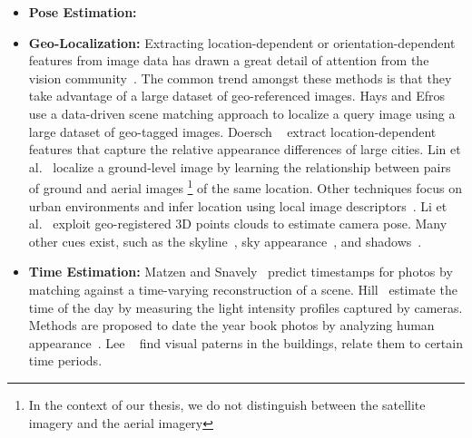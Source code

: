 \begin{itemize}[noitemsep]

\item \textbf{Pose Estimation:}
\newline

\item \textbf{Geo-Localization:}
Extracting location-dependent or orientation-dependent features from
image data has drawn a great detail of attention from the vision
community~\cite{jacobs07geolocate, jacobs11geolocate,
jacobs08geoorient}. The common trend amongst these methods is that
they take advantage of a large dataset of geo-referenced images. Hays
and Efros~\cite{hays2008im2gps} use a data-driven scene matching
approach to localize a query image using a large dataset of geo-tagged
images.  Doersch \etal~\cite{doersch2012what} extract
location-dependent features that capture the relative appearance
differences of large cities.  Lin et al.~\cite{lin2013cross} localize
a ground-level image by learning the relationship between pairs of
ground and aerial images \footnote{In the context of our thesis, we
do not distinguish between the satellite imagery and the aerial
imagery} of the same location. Other techniques focus
on urban environments and infer location using local image
descriptors~\cite{schindler2008detecting,snavely2006photo}. Li et
al.~\cite{li2012worldwide} exploit geo-registered 3D points clouds to
estimate camera pose. Many other cues exist, such as the
skyline~\cite{baatz2012large,ramalingam2009geolocalization}, sky
appearance~\cite{lalonde2010sun,workman2014rainbow}, and
shadows~\cite{junejo2008estimating,wu2010geo}.
\newline

\item \textbf{Time Estimation:}
Matzen and Snavely~\cite{matzen2014scene} predict
timestamps for photos by matching against a time-varying
reconstruction of a scene.  Hill~\cite{hill1994elephant} estimate the
time of the day by measuring the light intensity profiles captured by
cameras. Methods are proposed to date the
year book photos by analyzing human
appearance~\cite{salem2016face2year,ginosar2015century}. Lee
\etal~\cite{linking2015iccp} find visual paterns in the buildings,
relate them to certain time periods.
\newline

\end{itemize}

